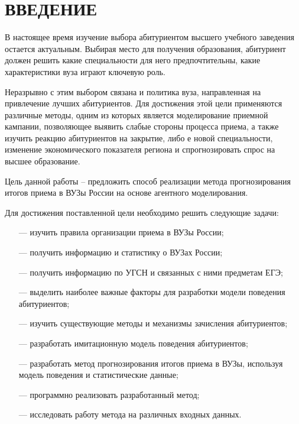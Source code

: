 \section*{ВВЕДЕНИЕ}

В настоящее время изучение выбора абитуриентом высшего учебного заведения остается актуальным. Выбирая место для получения образования, абитуриент должен решить какие специальности для него предпочтительны, какие характеристики вуза играют ключевую роль.

Неразрывно с этим выбором связана и политика вуза, направленная на привлечение лучших абитуриентов. Для достижения этой цели применяются различные методы, одним из которых является моделирование приемной кампании, позволяющее выявить слабые стороны процесса приема, а также
изучить реакцию абитуриентов на закрытие, либо е новой специальности, изменение экономического показателя региона и спрогнозировать спрос на высшее образование. 

Цель данной работы – предложить способ реализации метода прогнозирования итогов приема в ВУЗы России на основе агентного моделирования.

Для достижения поставленной цели необходимо решить следующие задачи:

\begin{itemize}[leftmargin=1.6\parindent]
	\item[---] изучить правила организации приема в ВУЗы России;
	\item[---] получить информацию и статистику о ВУЗах России;
	\item[---] получить информацию по УГСН и связанных с ними предметам ЕГЭ;
	\item[---] выделить наиболее важные факторы для разработки модели поведения абитуриентов;
	\item[---] изучить существующие методы и механизмы зачисления абитуриентов;
	\item[---] разработать имитационную модель поведения абитуриентов;
	\item[---] разработать метод прогнозирования итогов приема в ВУЗы, используя модель поведения и статистические данные;
	\item[---] программно реализовать разработанный метод;
	\item[---] исследовать работу метода на различных входных данных.
\end{itemize}


\pagebreak